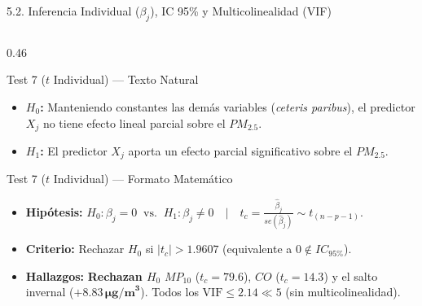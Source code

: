 \documentclass[aspectratio=169, 9pt]{beamer}
\begin{document}
\begin{frame}{5.2. Inferencia Individual ($\beta_j$), IC 95\% y Multicolinealidad (VIF)}
\begin{columns}[T]
  \begin{column}{0.46\textwidth}
    \begin{alertblock}{\footnotesize Test 7 ($t$ Individual) — Texto Natural}
      \scriptsize
      \begin{itemize}\setlength{\itemsep}{1pt}
        \item \textbf{$H_0$:} Manteniendo constantes las demás variables (\textit{ceteris paribus}), el predictor $X_j$ no tiene efecto lineal parcial sobre el $PM_{2.5}$.
        \item \textbf{$H_1$:} El predictor $X_j$ aporta un efecto parcial significativo sobre el $PM_{2.5}$.
      \end{itemize}
    \end{alertblock}

    \begin{exampleblock}{\footnotesize Test 7 ($t$ Individual) — Formato Matemático}
      \scriptsize
      \begin{itemize}\setlength{\itemsep}{1pt}
        \item \textbf{Hipótesis:} $H_0: \beta_j = 0 \;\;\text{vs.}\;\; H_1: \beta_j \neq 0 \quad \Big|\quad t_c = \frac{\hat{\beta}_j}{se(\hat{\beta}_j)} \sim t_{(n-p-1)}$.
        \item \textbf{Criterio:} Rechazar $H_0$ si $|t_c| > 1.9607$ (equivalente a $0 \notin IC_{95\%}$).
        \item \textbf{Hallazgos:} \textbf{Rechazan $H_0$} $MP_{10}$ ($t_c=79.6$), $CO$ ($t_c=14.3$) y el salto invernal ($\mathbf{+8.83\,\mu\text{g/m}^3}$). Todos los $\text{VIF} \le 2.14 \ll 5$ (sin multicolinealidad).
      \end{itemize}
    \end{exampleblock}
  \end{column}
\end{columns}
\end{frame}
\end{document}
